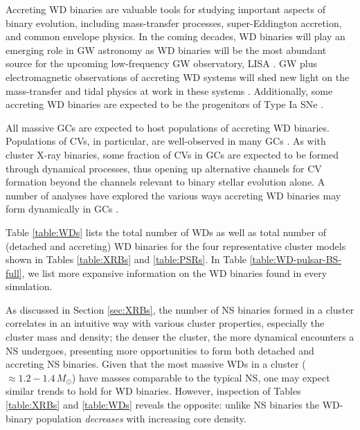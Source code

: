 \documentclass[twocolumn,tighten]{aastex63}
\begin{document}
Accreting WD binaries are valuable tools for studying important aspects of binary evolution, including mass-transfer processes, super-Eddington accretion, and common envelope physics. In the coming decades, WD binaries will play an emerging role in GW astronomy as WD binaries will be the most abundant source for the upcoming low-frequency GW observatory, LISA \citep{LISA2017}. GW plus electromagnetic observations of accreting WD systems will shed new light on the mass-transfer and tidal physics at work in these systems \citep[e.g.,][]{Breivik2018}. Additionally, some accreting WD binaries are expected to be the progenitors of Type Ia SNe \citep[e.g.,][]{Webbink1984,SharaHurley2002}.

All massive GCs are expected to host populations of accreting WD binaries. Populations of CVs, in particular, are well-observed in many GCs \citep[see, e.g.,][]{Knigge2012}. As with cluster X-ray binaries, some fraction of CVs in GCs are expected to be formed through dynamical processes, thus opening up alternative channels for CV formation beyond the channels relevant to binary stellar evolution alone. A number of analyses have explored the various ways accreting WD binaries may form dynamically in GCs \citep[e.g.,][]{Grindlay1995,Ivanova2006,Belloni2016,Belloni2019}.

Table \ref{table:WDs} lists the total number of WDs as well as total number of (detached and accreting) WD binaries for the four representative cluster models shown in Tables \ref{table:XRBs} and \ref{table:PSRs}. In Table \ref{table:WD-pulsar-BS-full}, we list more expansive information on the WD binaries found in every simulation.

As discussed in Section \ref{sec:XRBs}, the number of NS binaries formed in a cluster correlates in an intuitive way with various cluster properties, especially the cluster mass and density; the denser the cluster, the more dynamical encounters a NS undergoes, presenting more opportunities to form both detached and accreting NS binaries. Given that the most massive WDs in a cluster ($\approx1.2-1.4\,M_{\odot}$) have masses comparable to the typical NS, one may expect similar trends to hold for WD binaries. However, inspection of Tables \ref{table:XRBs} and \ref{table:WDs} reveals the opposite: unlike NS binaries the WD-binary population \textit{decreases} with increasing core density.
\end{document}

